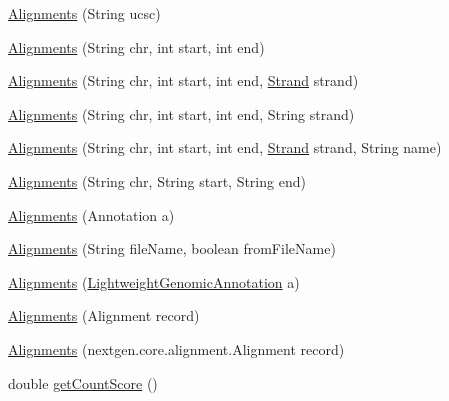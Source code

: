 \begin{DoxyCompactItemize}
\item 
\hyperlink{classbroad_1_1pda_1_1datastructures_1_1_alignments_a9c7b3cfad2506763f2ed056bbb6b4fc5}{Alignments} (String ucsc)
\item 
\hyperlink{classbroad_1_1pda_1_1datastructures_1_1_alignments_a41bc554b60e3826b989e3bfd84037d58}{Alignments} (String chr, int start, int end)
\item 
\hyperlink{classbroad_1_1pda_1_1datastructures_1_1_alignments_a5e042287bba50a322cc9aea1b565ee5c}{Alignments} (String chr, int start, int end, \hyperlink{enumumms_1_1core_1_1annotation_1_1_annotation_1_1_strand}{Strand} strand)
\item 
\hyperlink{classbroad_1_1pda_1_1datastructures_1_1_alignments_a2dc7b90ebd86b3973cf8b0a660a8ddf5}{Alignments} (String chr, int start, int end, String strand)
\item 
\hyperlink{classbroad_1_1pda_1_1datastructures_1_1_alignments_a021728814ac7253172aaf91d0c24d2f5}{Alignments} (String chr, int start, int end, \hyperlink{enumumms_1_1core_1_1annotation_1_1_annotation_1_1_strand}{Strand} strand, String name)
\item 
\hyperlink{classbroad_1_1pda_1_1datastructures_1_1_alignments_a36b870eaec51b922a97097b35a16022b}{Alignments} (String chr, String start, String end)
\item 
\hyperlink{classbroad_1_1pda_1_1datastructures_1_1_alignments_aef04491b1ce91213239ec205449fda55}{Alignments} (Annotation a)
\item 
\hyperlink{classbroad_1_1pda_1_1datastructures_1_1_alignments_ab6fc98f3378701e641bed4064c51eb4e}{Alignments} (String file\+Name, boolean from\+File\+Name)
\item 
\hyperlink{classbroad_1_1pda_1_1datastructures_1_1_alignments_aa6ba56e9069c344f02a4afa1e5b1bfdf}{Alignments} (\hyperlink{interfacebroad_1_1core_1_1annotation_1_1_lightweight_genomic_annotation}{Lightweight\+Genomic\+Annotation} a)
\item 
\hyperlink{classbroad_1_1pda_1_1datastructures_1_1_alignments_a36498047828b1c7b3e936671c6021c23}{Alignments} (Alignment record)
\item 
\hyperlink{classbroad_1_1pda_1_1datastructures_1_1_alignments_af6317e5a54a4bae0067571d749198bec}{Alignments} (nextgen.\+core.\+alignment.\+Alignment record)
\item 
double \hyperlink{classbroad_1_1pda_1_1datastructures_1_1_alignments_adc34f93586f8533504447b613d1358d8}{get\+Count\+Score} ()
\item 

\end{DoxyCompactItemize}

